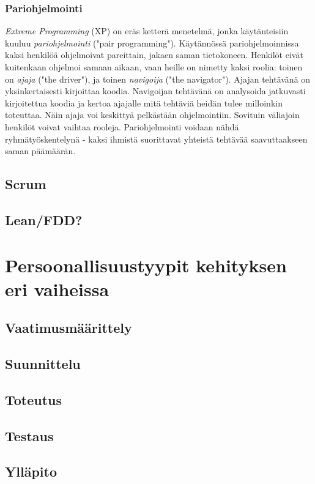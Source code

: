 \documentclass[finnish]{../tktltiki2}
\theoremstyle{definition}
\theoremstyle{remark}
\begin{document}
\subsubsection{Pariohjelmointi}

\emph{Extreme Programming} (XP) on eräs ketterä menetelmä, jonka käytänteisiin kuuluu \emph{pariohjelmointi} ("pair programming"). Käytännössä pariohjelmoinnissa kaksi henkilöä ohjelmoivat pareittain, jakaen saman tietokoneen. Henkilöt eivät kuitenkaan ohjelmoi samaan aikaan, vaan heille on nimetty kaksi roolia: toinen on \emph{ajaja} ("the driver"), ja toinen \emph{navigoija} ("the navigator"). Ajajan tehtävänä on yksinkertaisesti kirjoittaa koodia. Navigoijan tehtävänä on analysoida jatkuvasti kirjoitettua koodia ja kertoa ajajalle mitä tehtäviä heidän tulee milloinkin toteuttaa. Näin ajaja voi keskittyä pelkästään ohjelmointiin. Sovituin väliajoin henkilöt voivat vaihtaa rooleja. Pariohjelmointi voidaan nähdä ryhmätyöskentelynä - kaksi ihmistä suorittavat yhteistä tehtävää saavuttaakseen saman päämäärän. \cite{Shore:2007:AAD:1407480}

\subsection{Scrum}

\subsection{Lean/FDD?}

\section{Persoonallisuustyypit kehityksen eri vaiheissa}

\subsection{Vaatimusmäärittely}
\subsection{Suunnittelu}
\subsection{Toteutus}
\subsection{Testaus}
\subsection{Ylläpito}
\end{document}
